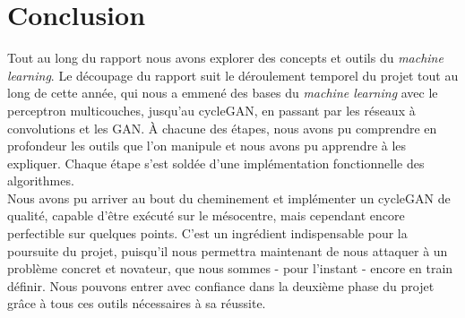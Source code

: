 \chapter*{Conclusion}


Tout au long du rapport nous avons explorer des concepts et outils du \textit{machine learning}. Le découpage du rapport suit le déroulement temporel du projet tout au long de cette année, qui nous a emmené des bases du \textit{machine learning} avec le perceptron multicouches, jusqu’au cycleGAN, en passant par les réseaux à convolutions et les GAN. À chacune des étapes, nous avons pu comprendre en profondeur les outils que l'on manipule et nous avons pu apprendre à les expliquer. Chaque étape s'est soldée d'une implémentation fonctionnelle des algorithmes.\\
Nous avons pu arriver au bout du cheminement et implémenter un cycleGAN de qualité, capable d'être exécuté sur le mésocentre, mais cependant encore perfectible sur quelques points. C'est un ingrédient indispensable pour la poursuite du projet, puisqu’il nous permettra maintenant de nous attaquer à un problème concret et novateur, que nous sommes - pour l'instant - encore en train définir. Nous pouvons entrer avec confiance dans la deuxième phase du projet grâce à tous ces outils nécessaires à sa réussite.